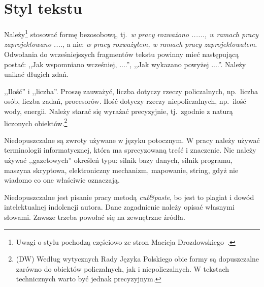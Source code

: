 \section*{Styl tekstu}

Należy\footnote{Uwagi o stylu pochodzą częściowo ze stron Macieja Drozdowskiego~.} 
stosować formę bezosobową, tj.~\emph{w pracy rozważono ......, 
w ramach pracy zaprojektowano ....}, a nie: \emph{w pracy rozważyłem, w ramach pracy zaprojektowałem}. 
Odwołania do wcześniejszych fragmentów tekstu powinny mieć następującą postać: ,,Jak wspomniano wcześniej, ....'', 
,,Jak wykazano powyżej ....''. Należy unikać długich zdań. 

,,Ilość'' i ,,liczba''. Proszę zauważyć, liczba dotyczy rzeczy policzalnych, np.~liczba osób, liczba zadań, procesorów. 
Ilość dotyczy rzeczy niepoliczalnych, np.~ilość wody, energii. Należy starać się wyrażać precyzyjnie, tj.~zgodnie 
z naturą liczonych obiektów.\footnote{(DW) Według wytycznych Rady Języka Polskiego obie formy są dopuszczalne
zarówno do obiektów policzalnych, jak i niepoliczalnych. W tekstach technicznych warto być jednak precyzyjnym.}

Niedopuszczalne są zwroty używane w języku potocznym. W pracy należy używać terminologii informatycznej, która ma 
sprecyzowaną treść i znaczenie. Nie należy używać ,,gazetowych'' określeń typu: 
silnik bazy danych, silnik programu, maszyna skryptowa, elektroniczny mechanizm, mapowanie, string, gdyż nie wiadomo 
co one właściwie oznaczają. 

Niedopuszczalne jest pisanie pracy metodą \emph{cut\&paste}, bo jest to plagiat i dowód intelektualnej indolencji autora.
Dane zagadnienie należy opisać własnymi słowami. Zawsze trzeba powołać się na zewnętrzne źródła. 

